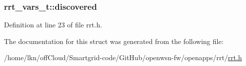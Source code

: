 \subsubsection[{\texorpdfstring{discovered}{discovered}}]{ rrt\+\_\+vars\+\_\+t\+::discovered}\hypertarget{structrrt__vars__t_a0fbca64481b98d2b323b7e8cf6a2652e}{}\label{structrrt__vars__t_a0fbca64481b98d2b323b7e8cf6a2652e}


Definition at line 23 of file rrt.\+h.



The documentation for this struct was generated from the following file\+:\begin{DoxyCompactItemize}
\item 
/home/lkn/off\+Cloud/\+Smartgrid-\/code/\+Git\+Hub/openwsn-\/fw/openapps/rrt/\hyperlink{rrt_8h}{rrt.\+h}\end{DoxyCompactItemize}
